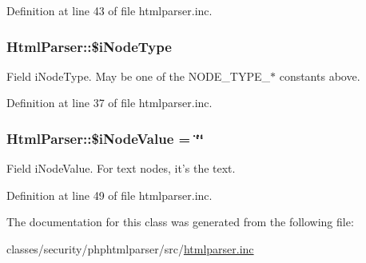 Definition at line 43 of file htmlparser.\+inc.

\hypertarget{classHtmlParser_a087961848d08ffdc95f7158cf2637b12}{
\subsubsection[{\$i\+Node\+Type}]{\setlength{\rightskip}{0pt plus 5cm}Html\+Parser\+::\$i\+Node\+Type}}\label{classHtmlParser_a087961848d08ffdc95f7158cf2637b12}
Field i\+Node\+Type. May be one of the N\+O\+D\+E\+\_\+\+T\+Y\+P\+E\+\_\+$\ast$ constants above. 

Definition at line 37 of file htmlparser.\+inc.

\hypertarget{classHtmlParser_a7ef6690232db5f37c310d78fa4839a79}{
\subsubsection[{\$i\+Node\+Value}]{\setlength{\rightskip}{0pt plus 5cm}Html\+Parser\+::\$i\+Node\+Value = \char`\"{}\char`\"{}}}\label{classHtmlParser_a7ef6690232db5f37c310d78fa4839a79}
Field i\+Node\+Value. For text nodes, it's the text. 

Definition at line 49 of file htmlparser.\+inc.



The documentation for this class was generated from the following file\+:\begin{DoxyCompactItemize}
\item 
classes/security/phphtmlparser/src/\hyperlink{htmlparser_8inc}{htmlparser.\+inc}\end{DoxyCompactItemize}
